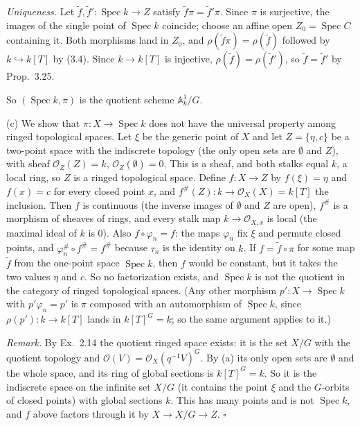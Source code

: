 \documentclass[11pt]{article}
\begin{document}
\emph{Uniqueness.} Let $\tilde f,\tilde f':\operatorname{Spec}k\to Z$ satisfy $\tilde f\pi=\tilde f'\pi$. Since $\pi$ is surjective, the images of the single point of $\operatorname{Spec}k$ coincide; choose an affine open $Z_0=\operatorname{Spec}C$ containing it. Both morphisms land in $Z_0$, and $\rho(\tilde f\pi)=\rho(\tilde f)$ followed by $k\hookrightarrow k[T]$ by (3.4). Since $k\to k[T]$ is injective, $\rho(\tilde f)=\rho(\tilde f')$, so $\tilde f=\tilde f'$ by Prop.~3.25.

So $(\operatorname{Spec}k,\pi)$ is the quotient scheme $\mathbb{A}^1_k/G$.

(c) We show that $\pi:X\to\operatorname{Spec}k$ does not have the universal property among ringed topological spaces. Let $\xi$ be the generic point of $X$ and let $Z=\{\eta,c\}$ be a two-point space with the indiscrete topology (the only open sets are $\emptyset$ and $Z$), with sheaf $\mathcal{O}_Z(Z)=k$, $\mathcal{O}_Z(\emptyset)=0$. This is a sheaf, and both stalks equal $k$, a local ring, so $Z$ is a ringed topological space. Define $f:X\to Z$ by $f(\xi)=\eta$ and $f(x)=c$ for every closed point $x$, and $f^\#(Z):k\to\mathcal{O}_X(X)=k[T]$ the inclusion. Then $f$ is continuous (the inverse images of $\emptyset$ and $Z$ are open), $f^\#$ is a morphism of sheaves of rings, and every stalk map $k\to\mathcal{O}_{X,x}$ is local (the maximal ideal of $k$ is $0$). Also $f\circ\varphi_n=f$: the maps $\varphi_n$ fix $\xi$ and permute closed points, and $\varphi_n^\#\circ f^\#=f^\#$ because $\tau_n$ is the identity on $k$. If $f=\tilde f\circ\pi$ for some map $\tilde f$ from the one-point space $\operatorname{Spec}k$, then $f$ would be constant, but it takes the two values $\eta$ and $c$. So no factorization exists, and $\operatorname{Spec}k$ is not the quotient in the category of ringed topological spaces. (Any other morphism $p':X\to\operatorname{Spec}k$ with $p'\varphi_n=p'$ is $\pi$ composed with an automorphism of $\operatorname{Spec}k$, since $\rho(p'):k\to k[T]$ lands in $k[T]^G=k$; so the same argument applies to it.)

\emph{Remark.} By Ex.~2.14 the quotient ringed space exists: it is the set $X/G$ with the quotient topology and $\mathcal{O}(V)=\mathcal{O}_X(q^{-1}V)^G$. By (a) its only open sets are $\emptyset$ and the whole space, and its ring of global sections is $k[T]^G=k$. So it is the indiscrete space on the infinite set $X/G$ (it contains the point $\xi$ and the $G$-orbits of closed points) with global sections $k$. This has many points and is not $\operatorname{Spec}k$, and $f$ above factors through it by $X\to X/G\to Z$. \hfill$\square$
\end{document}
